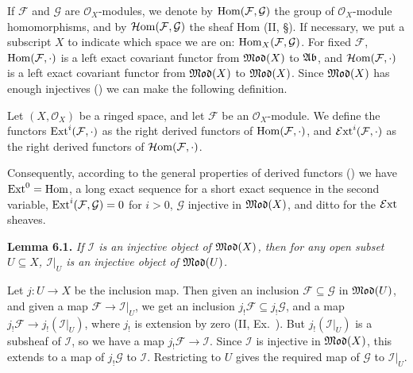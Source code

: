{If $\mathcal F$ and $\mathcal G$ are $\mathcal O_X$-modules, we denote by $\operatorname{Hom}(\mathcal F,\mathcal G)$ the group of $\mathcal O_X$-module homomorphisms, and by $\operatorname{\mathcal H om}(\mathcal F,\mathcal G)$ the sheaf Hom (II, \S{}). If necessary, we put a subscript $X$ to indicate which space we are on: $\operatorname{Hom}_X(\mathcal F,\mathcal G)$. For fixed $\mathcal F$, $\operatorname{Hom}(\mathcal F,\cdot)$ is a left exact covariant functor from $\operatorname{\mathfrak{Mod}}(X)$ to $\operatorname{\mathfrak{Ab}}$, and $\operatorname{\mathcal H om}(\mathcal F,\cdot)$ is a left exact covariant functor from $\operatorname{\mathfrak{Mod}}(X)$ to $\operatorname{\mathfrak{Mod}}(X)$. Since $\operatorname{\mathfrak{Mod}}(X)$ has enough injectives () we can make the following definition.

\Dfn Let $(X,\mathcal O_X)$ be a ringed space, and let $\mathcal F$ be an $\mathcal O_X$-module. We define the functors $\operatorname{Ext}^i(\mathcal F,\cdot)$ as the right derived functors of $\operatorname{Hom}(\mathcal F,\cdot)$, and $\operatorname{\mathcal E xt}^i(\mathcal F,\cdot)$ as the right derived functors of $\operatorname{\mathcal H om}(\mathcal F,\cdot)$.

\smallskip
Consequently, according to the general properties of derived functors () we have $\operatorname{Ext}^0=\operatorname{Hom}$, a long exact sequence for a short exact sequence in the second variable, $\operatorname{Ext}^i(\mathcal F,\mathcal G)=0$ for $i>0$, $\mathcal G$ injective in $\operatorname{\mathfrak{Mod}}(X)$, and ditto for the $\operatorname{\mathcal E xt}$ sheaves.

\medskip
\noindent\hypertarget{result-III-6.1}{}\textbf{Lemma 6.1.} \emph{If $\mathcal I$ is an injective object of $\operatorname{\mathfrak{Mod}}(X)$, then for any open subset $U\subseteq X$, $\mathcal I|_U$ is an injective object of $\operatorname{\mathfrak{Mod}}(U)$.}

\Proof Let $j\colon U\to X$ be the inclusion map. Then given an inclusion $\mathcal F\subseteq\mathcal G$ in $\operatorname{\mathfrak{Mod}}(U)$, and given a map $\mathcal F\to\mathcal I|_U$, we get an inclusion $j_!\mathcal F\subseteq j_!\mathcal G$, and a map $j_!\mathcal F\to j_!(\mathcal I|_U)$, where $j_!$ is extension by zero (II, Ex.~). But $j_!(\mathcal I|_U)$ is a subsheaf of $\mathcal I$, so we have a map $j_!\mathcal F\to\mathcal I$. Since $\mathcal I$ is injective in $\operatorname{\mathfrak{Mod}}(X)$, this extends to a map of $j_!\mathcal G$ to $\mathcal I$. Restricting to $U$ gives the required map of $\mathcal G$ to $\mathcal I|_U$.
}
